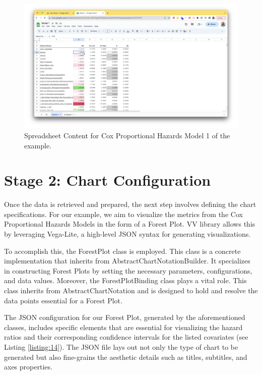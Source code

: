 \begin{figure}[ht]
  \centering
  \includegraphics[width=\textwidth]{media/fig14.png}
  \caption{Spreadsheet Content for Cox Proportional Hazards Model 1 of
  the example.}
  \label{fig:ss}
\end{figure}

\section{Stage 2: Chart
Configuration}\label{stage-2-chart-configuration}

Once the data is retrieved and prepared, the next step involves defining
the chart specifications. For our example, we aim to visualize the
metrics from the Cox Proportional Hazards Models in the form of a Forest
Plot. VV library allows this by leveraging Vega-Lite, a high-level JSON
syntax for generating visualizations.

To accomplish this, the ForestPlot class is employed. This class is a
concrete implementation that inherits from AbstractChartNotationBuilder.
It specializes in constructing Forest Plots by setting the necessary
parameters, configurations, and data values. Moreover, the
ForestPlotBinding class plays a vital role. This class inherits from
AbstractChartNotation and is designed to hold and resolve the data
points essential for a Forest Plot.

The JSON configuration for our Forest Plot, generated by the
aforementioned classes, includes specific elements that are essential
for visualizing the hazard ratios and their corresponding confidence
intervals for the listed covariates (see Listing \ref{listing:14}). The JSON file lays
out not only the type of chart to be generated but also fine-grains the
aesthetic details such as titles, subtitles, and axes properties.

